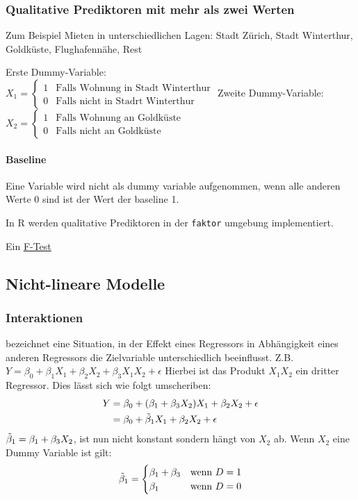 \documentclass[a3paper, 8pt]{extarticle}
\begin{document}
\begin{multicols*}{5}
\begin{enumerate}
\subsubsection{Qualitative Prediktoren mit mehr als zwei Werten}
Zum Beispiel Mieten in unterschiedlichen Lagen: Stadt Zürich, Stadt Winterthur, Goldküste, Flughafennähe, Rest

Erste Dummy-Variable: \\$X_1=\begin{cases}
  1  & \text{Falls Wohnung in Stadt Winterthur} \\
  0 & \text{Falls nicht in Stadrt Winterthur}
\end{cases}$
Zweite Dummy-Variable: \\$X_2=\begin{cases}
  1  & \text{Falls Wohnung an Goldküste} \\
  0 & \text{Falls nicht an Goldküste}
\end{cases}$

\paragraph{Baseline} Eine Variable wird nicht als dummy variable aufgenommen, wenn alle anderen Werte 0 sind ist der Wert der baseline 1.

In R werden qualitative Prediktoren in der \texttt{faktor} umgebung implementiert.

Ein \underline{F-Test} 

\subsection{Nicht-lineare Modelle}

\subsubsection{Interaktionen}
bezeichnet eine Situation, in der Effekt eines Regressors in Abhängigkeit eines anderen Regressors die Zielvariable unterschiedlich beeinﬂusst. Z.B. $Y=\beta_0+\beta_1X_1+\beta_2X_2+\beta_3X_1X_2+\epsilon$ Hierbei ist das Produkt $X_1X_2$ ein dritter Regressor. Dies lässt sich wie folgt umscheriben: \begin{align*}
    Y &= \beta_0 + (\beta_1+\beta_3X_2)X_1+\beta_2X_2+\epsilon \\ &= \beta_0 + \Tilde{\beta}_1 X_1+\beta_2X_2+\epsilon
\end{align*} $\Tilde{\beta}_1 = \beta_1 + \beta_3 X_2$, ist nun nicht konstant sondern hängt von $X_2$ ab. Wenn $X_2$ eine Dummy Variable ist gilt:
$$\Tilde{\beta}_1=\begin{cases}
    \beta_1 + \beta_3 &\text{wenn }D=1 \\
    \beta_1 &\text{wenn }D=0
\end{cases}$$

\end{enumerate}
\end{multicols*}
\end{document}
